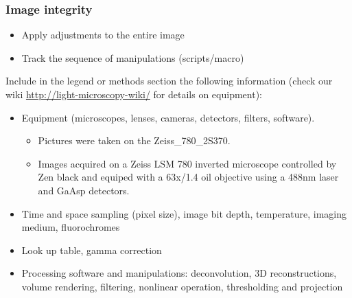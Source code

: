 \documentclass[ignorenonframetext,aspectratio=169,10pt,xcolor=table]{beamer}
\begin{document}
\begin{frame} \frametitle{Image integrity}

  \begin{itemize}
    \item Apply adjustments to the entire image
    \item Track the sequence of manipulations (scripts/macro)
  \end{itemize}

  Include in the legend or methods section the following
  information (check our wiki \url{http://light-microscopy-wiki/} for details on equipment):
  \begin{itemize}\small

    \item Equipment (microscopes, lenses, cameras, detectors,
          filters, software).

          \begin{itemize}
            \item[bad] Pictures were taken on the Zeiss\_780\_2S370.
            \item[good] Images acquired on a Zeiss LSM 780 inverted
                  microscope controlled by Zen black and equiped with a 63x/1.4 oil
                  objective using a 488nm laser and GaAsp detectors.
          \end{itemize}

    \item Time and space sampling (pixel size), image bit depth,
          temperature, imaging medium, fluorochromes
    \item Look up table, gamma correction
    \item Processing software and manipulations: deconvolution, 3D reconstructions,
          volume rendering, filtering, nonlinear operation, thresholding and projection
  \end{itemize}


\end{frame}
\end{document}
